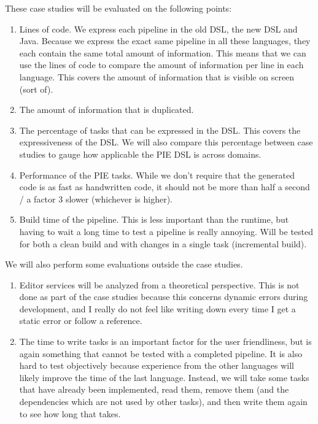 These case studies will be evaluated on the following points:
\begin{enumerate}
  \item Lines of code.
  We express each pipeline in the old DSL, the new DSL and Java.
  Because we express the exact same pipeline in all these languages, they each contain the same total amount of information.
  This means that we can use the lines of code to compare the amount of information per line in each language.
  This covers the amount of information that is visible on screen (sort of).
  \item The amount of information that is duplicated. 
  \item The percentage of tasks that can be expressed in the DSL.
  This covers the expressiveness of the DSL.
  We will also compare this percentage between case studies to gauge how applicable the PIE DSL is across domains.
  \item Performance of the PIE tasks.
  While we don't require that the generated code is as fast as handwritten code, it should not be more than half a second / a factor 3 slower (whichever is higher).
  \item Build time of the pipeline.
  This is less important than the runtime, but having to wait a long time to test a pipeline is really annoying.
  Will be tested for both a clean build and with changes in a single task (incremental build).
\end{enumerate}

We will also perform some evaluations outside the case studies.
\begin{enumerate}
  \item Editor services will be analyzed from a theoretical perspective.
  This is not done as part of the case studies because this concerns dynamic errors during development, and I really do not feel like writing down every time I get a static error or follow a reference.
  \item The time to write tasks is an important factor for the user friendliness, but is again something that cannot be tested with a completed pipeline.
  It is also hard to test objectively because experience from the other languages will likely improve the time of the last language.
  Instead, we will take some tasks that have already been implemented, read them, remove them (and the dependencies which are not used by other tasks), and then write them again to see how long that takes.
\end{enumerate}


